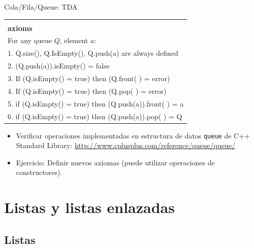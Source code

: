 \documentclass{beamer} %
\begin{document}
\begin{frame}{Cola/Fila/Queue: TDA}
    \scriptsize{
    \begin{tabular}{p{87ex}}\hline\\[-1ex]
      {\bf\normalsize axioms}\\
      For any queue $Q$, element $a$:\\[1.2ex]
      1. Q.size(), Q.IsEmpty(), Q.push(a) are always defined\\
      2. (Q.push(a)).isEmpty() = false\\
      3. If (Q.isEmpty() = true) then (Q.front( ) = error)\\
      4. If (Q.isEmpty() = true) then (Q.pop( ) = error)\\
      5. if (Q.isEmpty() = true) then (Q.push(a)).front( ) = a\\
      6. if (Q.isEmpty() = true) then (Q.push(a)).pop( ) = Q\\[1.5ex]\hline
    \end{tabular}

    \begin{itemize}
        \item<2-> Verificar operaciones implementadas en estructura de datos \texttt{queue} de C++ Standard Library: \url{http://www.cplusplus.com/reference/queue/queue/}
        \item<2-> Ejercicio: Definir nuevos axiomas (puede utilizar operaciones de constructores).
    \end{itemize}}
\end{frame}

\section{Listas y listas enlazadas}

\subsection{Listas}
\end{document}
